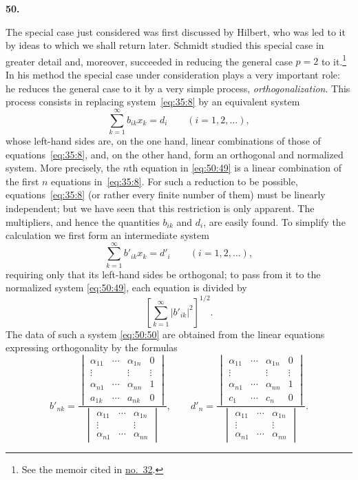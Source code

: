 \documentclass[
  paper=b5,
  fontsize=13pt,
  twoside=true,
  open=any,
  bookmarkpackage=false,
  chapterprefix=true,
  headings=normal
]{scrbook}
\theoremstyle{definition}
\newcommand{\numberedparagraph}[1]{%
  \par\medskip\phantomsection\label{sec:#1}%
  \noindent\textbf{#1.}\enspace
}
\begin{document}
\numberedparagraph{50}
The special case just considered was first discussed by Hilbert, who was
led to it by ideas to which we shall return later. Schmidt studied this
special case in greater detail and, moreover, succeeded in reducing the
general case $p=2$ to it.\footnote{See the memoir cited in
\hyperref[sec:32]{no.~32}.} In his method the special case under
consideration plays a very important role: he reduces the general case to
it by a very simple process, \emph{orthogonalization}. This process consists
in replacing system~\eqref{eq:35:8} by an equivalent system
\begin{equation}
  \sum_{k=1}^{\infty}b_{ik}x_k=d_i\qquad(i=1,2,\ldots),
  \tag{49}\label{eq:50:49}
\end{equation}
whose left-hand sides are, on the one hand, linear combinations of those
of equations~\eqref{eq:35:8}, and, on the other hand, form an orthogonal and normalized
system. More precisely, the $n$th equation in \eqref{eq:50:49} is a linear
combination of the first $n$ equations in~\eqref{eq:35:8}. For such a reduction to be
possible, equations~\eqref{eq:35:8} (or rather every finite number of them) must
be linearly independent; but we have seen that this restriction is only
apparent. The multipliers, and hence the quantities $b_{ik}$ and $d_i$, are
easily found. To simplify the calculation we first form an intermediate
system
\begin{equation}
  \sum_{k=1}^{\infty}b'_{ik}x_k=d'_i\qquad(i=1,2,\ldots),
  \tag{50}\label{eq:50:50}
\end{equation}
requiring only that its left-hand sides be orthogonal; to pass from it to
the normalized system \eqref{eq:50:49}, each equation is divided by
\[
  \left[\sum_{k=1}^{\infty}|b'_{ik}|^2\right]^{1/2}.
\]
The data of such a system \eqref{eq:50:50} are obtained from the linear
equations expressing orthogonality by the formulas
\[
 b'_{nk}=
 \frac{
 \begin{vmatrix}
  \alpha_{11}&\cdots&\alpha_{1n}&0\\
  \vdots&&\vdots&\vdots\\
  \alpha_{n1}&\cdots&\alpha_{nn}&1\\
  a_{1k}&\cdots&a_{nk}&0
 \end{vmatrix}}
 {\begin{vmatrix}
  \alpha_{11}&\cdots&\alpha_{1n}\\
  \vdots&&\vdots\\
  \alpha_{n1}&\cdots&\alpha_{nn}
 \end{vmatrix}},
 \qquad
 d'_n=
 \frac{
 \begin{vmatrix}
  \alpha_{11}&\cdots&\alpha_{1n}&0\\
  \vdots&&\vdots&\vdots\\
  \alpha_{n1}&\cdots&\alpha_{nn}&1\\
  c_1&\cdots&c_n&0
 \end{vmatrix}}
 {\begin{vmatrix}
  \alpha_{11}&\cdots&\alpha_{1n}\\
  \vdots&&\vdots\\
  \alpha_{n1}&\cdots&\alpha_{nn}
 \end{vmatrix}}.
\]
\end{document}
